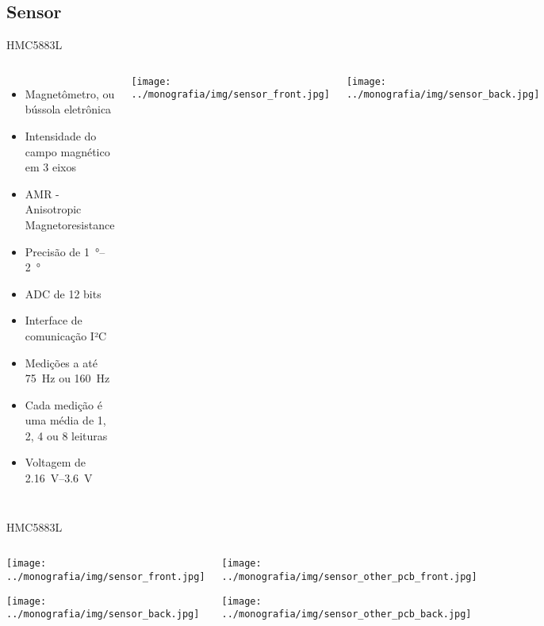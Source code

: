 \documentclass{beamer}
\begin{document}
\subsection{Sensor}

\begin{frame}{HMC5883L}
	\begin{columns}
		\pause
		\begin{itemize}[<+->]
			\item Magnetômetro, ou bússola eletrônica
			\item Intensidade do campo magnético em 3 eixos
			\item AMR - Anisotropic Magnetoresistance
			\item Precisão de \SIrange{1}{2}{\degree}
			\item ADC de 12 bits 
			\item Interface de comunicação I²C
			\item Medições a até \qty{75}{\hertz} ou \qty{160}{\hertz}
			\item Cada medição é uma média de 1, 2, 4 ou 8 leituras
			\item Voltagem de \SIrange{2.16}{3.6}{\volt}
		\end{itemize}

		\texttt{[image: ../monografia/img/sensor\_front.jpg]}

		\texttt{[image: ../monografia/img/sensor\_back.jpg]}
	\end{columns}
\end{frame}


\begin{frame}[label=fotos-sensor]{HMC5883L}
	\begin{columns}
		\column{.5\textwidth}
		\begin{center}
			\texttt{[image: ../monografia/img/sensor\_front.jpg]}

			\texttt{[image: ../monografia/img/sensor\_back.jpg]}
		\end{center}

		\column{.5\textwidth}
		\begin{center}
			\texttt{[image: ../monografia/img/sensor\_other\_pcb\_front.jpg]}

			\texttt{[image: ../monografia/img/sensor\_other\_pcb\_back.jpg]}
		\end{center}
	\end{columns}
\end{frame}
\end{document}
